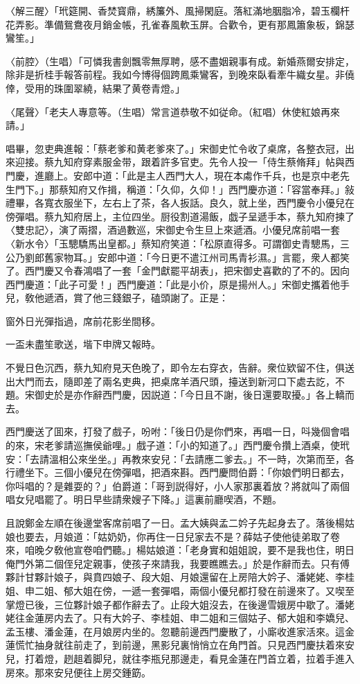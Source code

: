 〈解三醒〉「玳筵開、香焚寳鼎，綉簾外、風掃閑庭。落紅滿地胭脂冷，碧玉欄杆花弄影。準備鴛鴦夜月銷金帳，孔雀春風軟玉屏。合歡令，更有那鳳簫象板，錦瑟鸞笙。」

〈前腔〉（生唱）「可憐我書劍飄零無厚聘，感不盡姻親事有成。新婚燕爾安排定，除非是折桂手報答前程。我如今博得個跨鳳乘鸞客，到晚來臥看牽牛織女星。非僥倖，受用的珠圍翠繞，結果了黄卷青燈。」

〈尾聲〉「老夫人專意等。（生唱）常言道恭敬不如従命。（紅唱）休使紅娘再來請。」

唱畢，忽吏典進報：「蔡老爹和黄老爹來了。」宋御史忙令收了桌席，各整衣冠，出來迎接。蔡九知府穿素服金带，跟着許多官吏。先令人投一「侍生蔡脩拜」帖與西門慶，進廳上。安郎中道：「此是主人西門大人，現在本䖏作千兵，也是京中老先生門下。」那蔡知府又作揖，稱道：「久仰，久仰！」西門慶亦道：「容當奉拜。」敍禮畢，各寬衣服坐下，左右上了茶，各人扳話。良久，就上坐，西門慶令小優兒在傍彈唱。蔡九知府居上，主位四坐。厨役割道湯飯，戯子呈遞手本，蔡九知府揀了〈雙忠記〉，演了兩摺，酒過數巡，宋御史令生旦上來遞酒。小優兒席前唱一套〈新水令〉「玉驄驕馬出皇都。」蔡知府笑道：「松原直得多。可謂御史青驄馬，三公乃劉郎舊家物耳。」安郎中道：「今日更不遣江州司馬青衫濕。」言罷，衆人都笑了。西門慶又令春鴻唱了一套「金門獻罷平胡表」，把宋御史喜歡的了不的。因向西門慶道：「此子可愛！」西門慶道：「此是小价，原是揚州人。」宋御史攜着他手兒，敎他遞酒，賞了他三錢銀子，磕頭謝了。正是：

窗外日光彈指過，席前花影坐間移。

一盃未盡笙歌送，堦下申牌又報時。

不覺日色沉西，蔡九知府見天色晚了，即令左右穿衣，告辭。衆位欵留不住，俱送出大門而去，隨即差了兩名吏典，把桌席羊酒尺頭，擡送到新河口下處去訖，不題。宋御史於是亦作辭西門慶，因説道：「今日且不謝，後日還要取擾。」各上轎而去。

西門慶送了囬來，打發了戲子，吩咐：「後日仍是你們來，再唱一日，呌幾個會唱的來，宋老爹請巡撫侯爺哩。」戲子道：「小的知道了。」西門慶令攢上酒桌，使玳安：「去請溫相公來坐坐。」再教來安兒：「去請應二爹去。」不一時，次第而至，各行禮坐下。三個小優兒在傍彈唱，把酒來斟。西門慶問伯爵：「你娘們明日都去，你呌唱的？是雜耍的？」伯爵道：「哥到説得好，小人家那裏着放？將就叫了兩個唱女兒唱罷了。明日早些請衆嫂子下降。」這裏前廳喫酒，不題。

且說鄭金左順在後邊堂客席前唱了一日。孟大姨與孟二妗子先起身去了。落後楊姑娘也要去，月娘道：「姑奶奶，你再住一日兒家去不是？薛姑子使他徒弟取了卷來，咱晚夕敎他宣卷咱們聽。」楊姑娘道：「老身實和姐姐說，要不是我也住，明日俺門外第二個侄兒定親事，使孩子來請我，我要瞧瞧去。」於是作辭而去。只有傅夥計甘夥計娘子，與賁四娘子、段大姐、月娘還留在上房陪大妗子、潘姥姥、李桂姐、申二姐、郁大姐在傍，一遞一套彈唱，兩個小優兒都打發在前邊來了。又喫至掌燈已後，三位夥計娘子都作辭去了。止段大姐沒去，在後邊雪娥房中歇了。潘姥姥往金蓮房内去了。只有大妗子、李桂姐、申二姐和三個姑子、郁大姐和李嬌兒、孟玉樓、潘金蓮，在月娘房内坐的。忽聽前邊西門慶散了，小廝收進家活來。這金蓮慌忙抽身就往前走了，到前邊，黑影兒裏悄悄立在角門首。只見西門慶扶着來安兒，打着燈，趔趄着脚兒，就往李瓶兒那邊走，看見金蓮在門首立着，拉着手進入房來。那來安兒便往上房交鍾筯。

